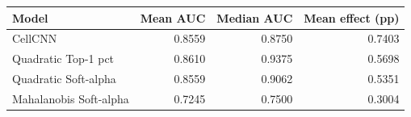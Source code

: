 \begin{tabular}{lrrr}
\toprule
Model & Mean AUC & Median AUC & Mean effect (pp) \\
\midrule
CellCNN & 0.8559 & 0.8750 & 0.7403 \\
Quadratic Top-1 pct & 0.8610 & 0.9375 & 0.5698 \\
Quadratic Soft-alpha & 0.8559 & 0.9062 & 0.5351 \\
Mahalanobis Soft-alpha & 0.7245 & 0.7500 & 0.3004 \\
\bottomrule
\end{tabular}

